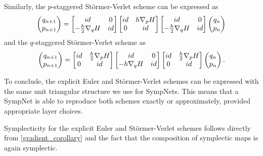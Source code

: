 \documentclass[twoside,a4paper]{article}
\begin{document}
Similarly, the $p$-staggered Störmer-Verlet scheme can be expressed as
\begin{equation*}
	\begin{pmatrix}
		q_{n+1} \\
		p_{n+1}
	\end{pmatrix} =
	\begin{bmatrix}
		id & 0 \\
		-\frac{h}{2} \grad[q]{H} & id
	\end{bmatrix}
	\begin{bmatrix}
		id & h \grad[p]{H} \\
		0 & id
	\end{bmatrix}
	\begin{bmatrix}
		id & 0 \\
		-\frac{h}{2} \grad[q]{H} & id
	\end{bmatrix}
	\begin{pmatrix}
		q_{n} \\
		p_{n}
	\end{pmatrix}
\end{equation*}
and the $q$-staggered Störmer-Verlet scheme as
\begin{equation*}
	\begin{pmatrix}
		q_{n+1} \\
		p_{n+1}
	\end{pmatrix} =
	\begin{bmatrix}
		id & \frac{h}{2} \grad[p]{H} \\
		0 & id
	\end{bmatrix}
	\begin{bmatrix}
		id & 0 \\
		-h \grad[q]{H} & id
	\end{bmatrix}
	\begin{bmatrix}
		id & \frac{h}{2} \grad[p]{H} \\
		0 & id
	\end{bmatrix}
	\begin{pmatrix}
		q_{n} \\
		p_{n}
	\end{pmatrix}
	.
\end{equation*}

To conclude, the explicit Euler and Störmer-Verlet schemes can be expressed with
the same unit triangular structure we use for SympNets. This means that a SympNet is able
to reproduce both schemes exactly or approximately, provided appropriate layer choices.

Symplecticity for the explicit Euler and Störmer-Verlet schemes follows directly 
from \cref{gradient_corollary} and the fact that the composition of symplectic maps is again symplectic.
\end{document}

